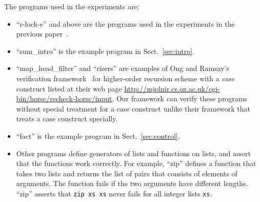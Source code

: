 The programs used in the experiments are:
\begin{itemize}
\item ``r-lock-e'' and above are the programs used in the experiments in
      the previous paper~\cite{KobayashiPLDI2011}.
\item ``sum\_intro'' is the example program in Sect.~\ref{sec:intro}.
\item ``map\_head\_filter'' and ``risers'' are examples of Ong and
      Ramsay's verification framework~\cite{Ong2011} for higher-order
      recursion scheme with a \textit{case} construct listed at their
      web page
      \url{http://mjolnir.cs.ox.ac.uk/cgi-bin/horsc/recheck-horsc/input}.
      Our framework can verify these programs without special treatment
      for a case construct unlike their framework that treats a case construct specially.
\item ``fact'' is the example program in Sect.~\ref{sec:control}.
\item Other programs define generators of lists and functions on lists,
      and assert that the functions work correctly.  For example,
      ``zip'' defines a function that takes two lists and returns the
      list of pairs that consists of elements of arguments.
      The function fails if the two arguments have different lengths.
      ``zip'' asserts that \texttt{zip xs xs} never fails for all integer lists \texttt{xs}.
\end{itemize}
